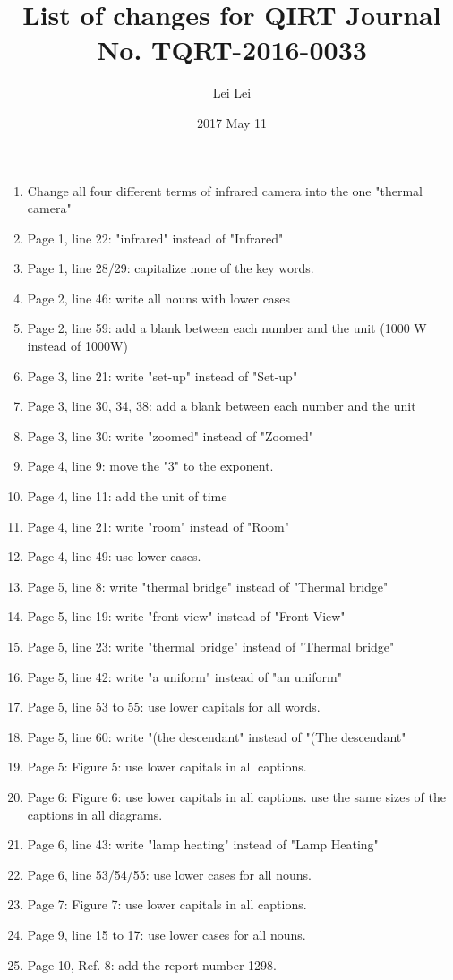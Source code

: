 \documentclass[letter]{article}
\begin{document}
    
\title{List of changes for QIRT Journal No. TQRT-2016-0033}
\author{Lei Lei}
\date{2017 May 11}

\maketitle


\begin{enumerate}
    \item Change all four different terms of infrared camera into the one "thermal camera"
    \item Page 1, line 22: "infrared" instead of "Infrared"
    \item Page 1, line 28/29: capitalize none of the key words.
    \item Page 2, line 46: write all nouns with lower cases 
    \item Page 2, line 59: add a blank between each number and the unit (1000 W instead of 1000W) 
    \item Page 3, line 21: write "set-up" instead of "Set-up"
    \item Page 3, line 30, 34, 38: add a blank between each number and the unit 
    \item Page 3, line 30: write "zoomed" instead of "Zoomed"
    \item Page 4, line 9: move the "3" to the exponent.
    \item Page 4, line 11: add the unit of time 
    \item Page 4, line 21: write "room" instead of "Room"
    \item Page 4, line 49: use lower cases.
    \item Page 5, line 8: write "thermal bridge" instead of "Thermal bridge"
    \item Page 5, line 19: write "front view" instead of "Front View"
    \item Page 5, line 23: write "thermal bridge" instead of "Thermal bridge"
    \item Page 5, line 42: write "a uniform" instead of "an uniform"
    \item Page 5, line 53 to 55: use lower capitals for all words.
    \item Page 5, line 60: write "(the descendant" instead of "(The descendant"
    \item Page 5: Figure 5: use lower capitals in all captions.
    \item Page 6: Figure 6: use lower capitals in all captions. use the same sizes of the captions in all diagrams.
    \item Page 6, line 43: write "lamp heating" instead of "Lamp Heating"
    \item Page 6, line 53/54/55: use lower cases for all nouns.
    \item Page 7: Figure 7: use lower capitals in all captions.
    \item Page 9, line 15 to 17: use lower cases for all nouns.
    \item Page 10, Ref. 8: add the report number 1298.

\end{enumerate}
\end{document}

